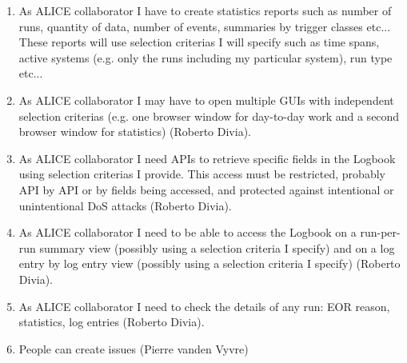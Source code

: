 \begin{enumerate}
  \item As ALICE collaborator I have to create statistics reports such as number of runs, quantity of data, number of events, summaries by trigger classes etc... These reports will use selection criterias I will specify such as time spans, active systems (e.g. only the runs including my particular system), run type etc...
\item As ALICE collaborator I may have to open multiple GUIs with independent selection criterias (e.g. one browser window for day-to-day work and a second browser window for statistics) (Roberto Divia).
\item As ALICE collaborator I need APIs to retrieve specific fields in the Logbook using selection criterias I provide. This access must be restricted, probably API by API or by fields being accessed, and protected against intentional or unintentional DoS attacks (Roberto Divia).
\item As ALICE collaborator I need to be able to access the Logbook on a run-per-run summary view (possibly using a selection criteria I specify) and on a log entry by log entry view (possibly using a selection criteria I specify) (Roberto Divia).
\item As ALICE collaborator I need to check the details of any run: EOR reason, statistics, log entries (Roberto Divia).
  \item People can create issues (Pierre vanden Vyvre)
\end{enumerate}

